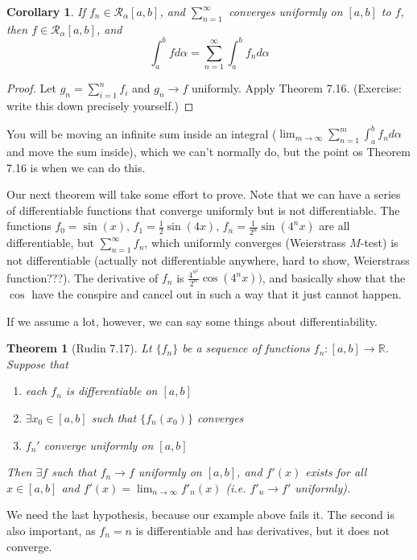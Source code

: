 \documentclass{article}
\theoremstyle{plain}
\newtheorem{theorem}{Theorem}
\newtheorem{corollary}{Corollary}
\theoremstyle{remark}
\newcommand{\R}{{\mathbb R}}
\begin{document}
\begin{corollary}
	If $f_n \in \mathcal{R}_\alpha[a,b]$, and $\sum_{n=1}^\infty$
	converges uniformly on $[a,b]$ to $f$, then $f\in \mathcal{R}_\alpha[a,b]$, and
	\[
		\int_a^b fd\alpha = \sum_{n=1}^\infty \int_a^b f_nd\alpha
	\]
\end{corollary}
\begin{proof}
	Let $g_n = \sum_{i=1}^n f_i$ and $g_n \to f$ uniformly.
	Apply Theorem 7.16.
	(Exercise: write this down precisely yourself.)
\end{proof}
You will be moving an infinite sum inside an integral
($\lim_{m\to\infty}\sum_{n=1}^m \int_a^b f_nd\alpha$ and move the sum inside),
which we can't normally do, but the point os Theorem 7.16 is when we can do this.

Our next theorem will take some effort to prove.
Note that we can have a series of differentiable functions
that converge uniformly but is not differentiable.
The functions $f_0 = \sin(x)$, $f_1 = \frac12 \sin(4x)$, $f_n = \frac{1}{2^n} \sin(4^nx)$
are all differentiable,
but  $\sum_{n=1}^\infty f_n$, which uniformly converges
(Weierstrass $M$-test) is not differentiable
(actually not differentiable anywhere, hard to show, Weierstrass function???).
The derivative of $f_n$ is $\frac{4^{n^2}}{2^n}\cos(4^nx))$,
and basically show that the $\cos$ have the conspire and cancel out in such a way
that it just cannot happen.

If we assume a lot, however, we can say some things about differentiability.
\begin{theorem}[Rudin 7.17]
	Lt $\{f_n\}$ be a sequence of functions $f_n \colon [a,b] \to \R$.
	Suppose that
	\begin{enumerate}
		\item each $f_n$ is differentiable on $[a,b]$
		\item $\exists x_0 \in [a,b]$ such that $\{f_n(x_0)\}$ converges
		\item $f_n'$ converge uniformly on $[a,b]$
	\end{enumerate}
	Then $\exists f$ such that $f_n \to f$ uniformly on $[a,b]$,
	and $f'(x)$ exists for all $x\in[a,b]$ and $f'(x) = \lim_{n\to\infty} f'_n(x)$
	(i.e. $f'_n \to f'$ uniformly).
\end{theorem}
We need the last hypothesis, because our example above fails it.
The second is also important, as $f_n = n$ is differentiable and has derivatives,
but it does not converge.
\end{document}
